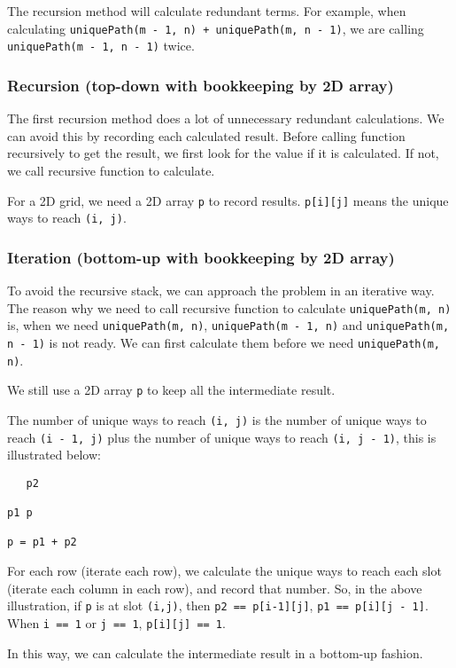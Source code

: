 \documentclass[12pt]{article}
\begin{document}
The recursion method will calculate redundant terms. For example, when calculating \texttt{uniquePath(m - 1, n) + uniquePath(m, n - 1)}, we are calling \texttt{uniquePath(m - 1, n - 1)} twice.
\subsubsection{Recursion (top-down with bookkeeping by 2D array)}
\label{sec:orga1f5cbb}
The first recursion method does a lot of unnecessary redundant calculations. We can avoid this by recording each calculated result. Before calling function recursively to get the result, we first look for the value if it is calculated. If not, we call recursive function to calculate.

For a 2D grid, we need a 2D array \texttt{p} to record results. \texttt{p[i][j]} means the unique ways to reach \texttt{(i, j)}.
\subsubsection{Iteration (bottom-up with bookkeeping by 2D array)}
\label{sec:orgf4def5c}
To avoid the recursive stack, we can approach the problem in an iterative way. The reason why we need to call recursive function to calculate \texttt{uniquePath(m, n)} is, when we need \texttt{uniquePath(m, n)}, \texttt{uniquePath(m - 1, n)} and \texttt{uniquePath(m, n - 1)} is not ready. We can first calculate them before we need \texttt{uniquePath(m, n)}.

We still use a 2D array \texttt{p} to keep all the intermediate result.

The number of unique ways to reach \texttt{(i, j)} is the number of unique ways to reach \texttt{(i - 1, j)} plus the number of unique ways to reach \texttt{(i, j - 1)}, this is illustrated below:
\begin{verbatim}
   p2

p1 p

p = p1 + p2
\end{verbatim}
For each row (iterate each row), we calculate the unique ways to reach each slot (iterate each column in each row), and record that number. So, in the above illustration, if \texttt{p} is at slot \texttt{(i,j)}, then \texttt{p2 == p[i-1][j]}, \texttt{p1 == p[i][j - 1]}. When \texttt{i == 1} or \texttt{j == 1}, \texttt{p[i][j] == 1}.

In this way, we can calculate the intermediate result in a bottom-up fashion.
\end{document}
